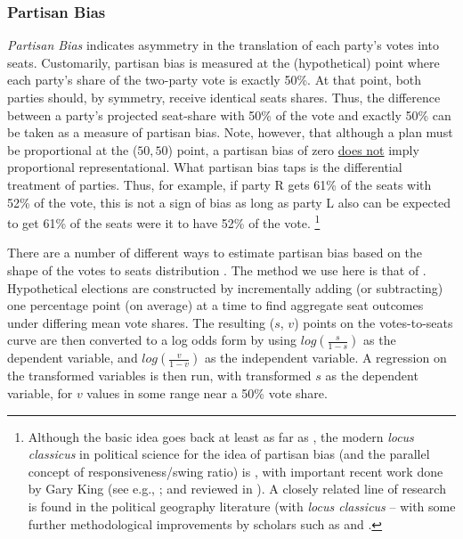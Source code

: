             \subsubsection*{Partisan Bias}
%
    \textit{Partisan Bias} indicates asymmetry in the translation of each party’s votes into seats. Customarily, partisan bias is measured at the (hypothetical) point where each party’s share of the two-party vote is exactly 50\%. At that point, both parties should, by symmetry, receive identical seats shares. Thus, the difference between a party’s projected seat-share with 50\% of the vote and exactly 50\% can be taken as a measure of partisan bias. Note, however, that although a plan must be proportional at the ($50,50$) point, a partisan bias of zero \underline{does not} imply proportional representational. What partisan bias taps is the differential treatment of parties. Thus, for example, if party R gets 61\% of the seats with 52\% of the vote, this is not a sign of bias as long as party L also can be expected to get 61\% of the seats were it to have 52\% of the vote.
        \footnote{Although the basic idea goes back at least as far as \citet{Dahl1956}, the modern \textit{locus classicus} in political science for the idea of partisan bias (and the parallel concept of responsiveness/swing ratio) is \citet{Tufte1973}, with important recent work done by Gary King (see e.g., \citep{GelmanKing1994_unifiedAJPS}; and reviewed in \citet{GrofmanKing2007_ELJ}). A closely related line of research is found in the political geography literature (with \textit{locus classicus} \citet{Brookes1959, Brookes1960} -- with some further methodological improvements by scholars such as \citet{Johnston1994, Rossiter1997} and \citet{Johnston2002}.}   
\par
    There are a number of different ways to estimate partisan bias based on the shape of the votes to seats distribution \citep{Tufte1973, Grofman1983, Browning_King_1987_seats_votes, GelmanKing1994_unifiedAJPS, Grofman_et_al_1997_SwingRatio_Bias, Zingher2016_bias_swingratio_JEPP}. The method we use here is that of \citet{Tufte1973}. Hypothetical elections are constructed by incrementally adding (or subtracting) one percentage point (on average) at a time to find aggregate seat outcomes under differing mean vote shares. The resulting ($s$, $v$) points on the votes-to-seats curve are then converted to a log odds form by using $ log(\frac{s}{1-s}) $ as the dependent variable, and $ log(\frac{v}{1-v}) $ as the independent variable. A regression on the transformed variables is then run, with transformed $s$ as the dependent variable, for $v$ values in some range near a 50\% vote share. 
